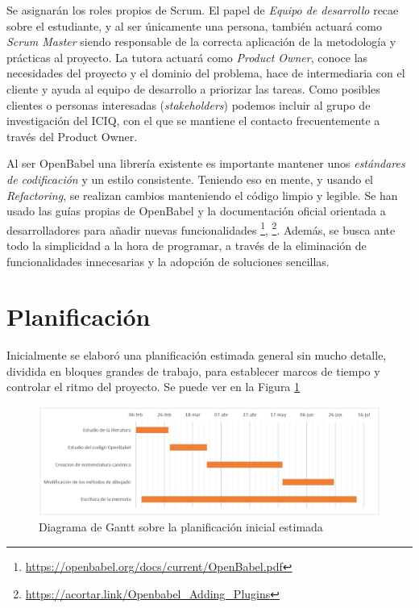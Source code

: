 Se asignarán los roles propios de Scrum. El papel de \emph{Equipo de desarrollo} recae sobre el estudiante, y al ser únicamente una persona, también actuará como \emph{Scrum Master} siendo responsable de la correcta aplicación de la metodología y prácticas al proyecto. La tutora actuará como \emph{Product Owner}, conoce las necesidades del proyecto y el dominio del problema, hace de intermediaria con el cliente y ayuda al equipo de desarrollo a priorizar las tareas. Como posibles clientes o personas interesadas (\emph{stakeholders}) podemos incluir al grupo de investigación del ICIQ, con el que se mantiene el contacto frecuentemente a través del Product Owner.

Al ser OpenBabel una librería existente es importante mantener unos \emph{estándares de codificación} y un estilo consistente. Teniendo eso en mente, y usando el \emph{Refactoring}, se realizan cambios manteniendo el código limpio y legible. Se han usado las guías propias de OpenBabel y la documentación oficial orientada a desarrolladores para añadir nuevas funcionalidades \footnote{\url{https://openbabel.org/docs/current/OpenBabel.pdf}}, \footnote{\url{https://acortar.link/Openbabel_Adding_Plugins}}. Además, se busca ante todo la simplicidad a la hora de programar, a través de la eliminación de funcionalidades innecesarias y la adopción de soluciones sencillas.

\section{Planificación}
Inicialmente se elaboró una planificación estimada general sin mucho detalle, dividida en bloques grandes de trabajo, para establecer marcos de tiempo y controlar el ritmo del proyecto. Se puede ver en la Figura \ref{fig:gantt_incial_estimado}
\begin{figure}[h!]
    \centering
    \includegraphics[scale=0.32]{imagenes/planificacion/planificacion_estimada.png}
    \caption{Diagrama de Gantt sobre la planificación inicial estimada}
    \label{fig:gantt_incial_estimado}
\end{figure}

